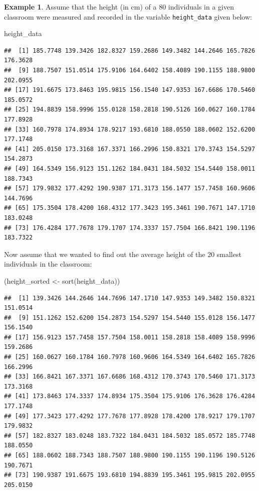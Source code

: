 \documentclass[
]{book}
\newenvironment{Shaded}{\begin{snugshade}}{\end{snugshade}}
\newcommand{\FunctionTok}[1]{\textcolor[rgb]{0.00,0.00,0.00}{#1}}
\newcommand{\NormalTok}[1]{#1}
\newcommand{\OtherTok}[1]{\textcolor[rgb]{0.56,0.35,0.01}{#1}}
\theoremstyle{definition}
\theoremstyle{definition}
\newtheorem{example}{Example}[chapter]
\theoremstyle{definition}
\theoremstyle{definition}
\theoremstyle{remark}
\begin{document}
\begin{example}

Assume that the height (in cm) of a 80 individuals in a given classroom were measured and recorded in the variable \texttt{height\_data} given below:

\begin{Shaded}
\begin{Highlighting}[]
\NormalTok{height\_data}
\end{Highlighting}
\end{Shaded}

\begin{verbatim}
##  [1] 185.7748 139.3426 182.8327 159.2686 149.3482 144.2646 165.7826 176.3628
##  [9] 188.7507 151.0514 175.9106 164.6402 158.4089 190.1155 188.9800 202.0955
## [17] 191.6675 173.8463 195.9815 156.1540 147.9353 167.6686 170.5460 185.0572
## [25] 194.8839 158.9996 155.0128 158.2818 190.5126 160.0627 160.1784 177.8928
## [33] 160.7978 174.8934 178.9217 193.6810 188.0550 188.0602 152.6200 177.1748
## [41] 205.0150 173.3168 167.3371 166.2996 150.8321 170.3743 154.5297 154.2873
## [49] 164.5349 156.9123 151.1262 184.0431 184.5032 154.5440 158.0011 188.7343
## [57] 179.9832 177.4292 190.9387 171.3173 156.1477 157.7458 160.9606 144.7696
## [65] 175.3504 178.4200 168.4312 177.3423 195.3461 190.7671 147.1710 183.0248
## [73] 176.4284 177.7678 179.1707 174.3337 157.7504 166.8421 190.1196 183.7322
\end{verbatim}

Now assume that we wanted to find out the average height of the 20 smallest individuals in the classroom:

\begin{Shaded}
\begin{Highlighting}[]
\NormalTok{(height\_sorted }\OtherTok{\textless{}{-}} \FunctionTok{sort}\NormalTok{(height\_data))}
\end{Highlighting}
\end{Shaded}

\begin{verbatim}
##  [1] 139.3426 144.2646 144.7696 147.1710 147.9353 149.3482 150.8321 151.0514
##  [9] 151.1262 152.6200 154.2873 154.5297 154.5440 155.0128 156.1477 156.1540
## [17] 156.9123 157.7458 157.7504 158.0011 158.2818 158.4089 158.9996 159.2686
## [25] 160.0627 160.1784 160.7978 160.9606 164.5349 164.6402 165.7826 166.2996
## [33] 166.8421 167.3371 167.6686 168.4312 170.3743 170.5460 171.3173 173.3168
## [41] 173.8463 174.3337 174.8934 175.3504 175.9106 176.3628 176.4284 177.1748
## [49] 177.3423 177.4292 177.7678 177.8928 178.4200 178.9217 179.1707 179.9832
## [57] 182.8327 183.0248 183.7322 184.0431 184.5032 185.0572 185.7748 188.0550
## [65] 188.0602 188.7343 188.7507 188.9800 190.1155 190.1196 190.5126 190.7671
## [73] 190.9387 191.6675 193.6810 194.8839 195.3461 195.9815 202.0955 205.0150
\end{verbatim}


\end{example}
\end{document}
